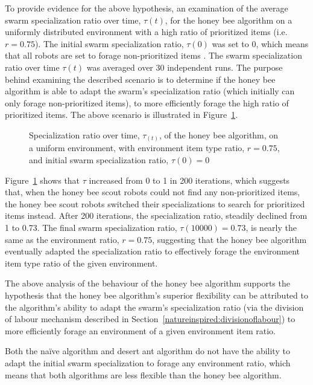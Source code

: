 To provide evidence for the above hypothesis, an examination of the average swarm specialization ratio over time, $\tau(t)$, for the honey bee algorithm on a uniformly distributed environment with a high ratio of prioritized items (i.e. $r = 0.75$). The initial swarm specialization ratio, $\tau(0)$ was set to 0, which means that all robots are set to forage non-prioritized items . The swarm specialization ratio over time $\tau(t)$ was averaged over 30 independent runs. The purpose behind examining the described scenario is to determine if the honey bee algorithm is able to adapt the swarm's specialization ratio (which initially can only forage non-prioritized items), to more efficiently forage the high ratio of prioritized items. The above scenario is illustrated in Figure~\ref{fig:specializationratioovertime}. 


\begin{figure}[!htb]
\centering
\resizebox{\textwidth}{!}{}
\caption{Specialization ratio over time, $\tau_(t)$, of the honey bee algorithm, on a uniform environment, with environment item type ratio, $r=0.75$, and initial swarm specialization ratio, $\tau(0)=0$}
\label{fig:specializationratioovertime}
\end{figure}

Figure~\ref{fig:specializationratioovertime} shows that $\tau$ increased from 0 to 1 in 200 iterations, which suggests that, when the honey bee scout robots could not find any non-prioritized items, the honey bee scout robots switched their specializations to search for prioritized items instead. After 200 iterations, the specialization ratio, steadily declined from 1 to 0.73. The final swarm specialization ratio, $\tau(10000)=0.73$, is nearly the same as the environment ratio, $r=0.75$, suggesting that the honey bee algorithm eventually adapted the specialization ratio to effectively forage the environment item type ratio of the given environment.

The above analysis of the behaviour of the honey bee algorithm supports the hypothesis that the honey bee algorithm's superior flexibility can be attributed to the algorithm's ability to adapt the swarm's specialization ratio (via the division of labour mechanism described in Section~\ref{natureinspired:divisionoflabour}) to more efficiently forage an environment of a given environment item ratio.

Both the na\"ive algorithm and desert ant algorithm do not have the ability to adapt the initial swarm specialization to forage any environment ratio, which means that both algorithms are  less flexible than the honey bee algorithm. 

